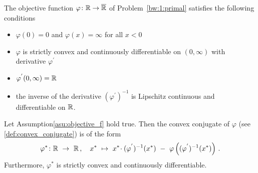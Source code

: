 \newpage
\begin{assumption}
  \label{asu:objective_f}
  The objective function $\varphi\colon \mathbb{R}\to\overline{\mathbb{R}}$ of Problem~\ref{bw:1:primal} 
  satisfies the following conditions
  \begin{itemize}
    \item
      $\varphi(0)=0$ and $\varphi(x)=\infty$ for all $x<0$
    \item
      $\varphi$ is strictly convex and continuously differentiable on $(0,\infty)$ with derivative $\varphi^{'}$
    \item
      $\varphi^{'}(0,\infty)=\mathbb{R}$
    \item
      the inverse of the derivative $(\varphi^{'})^{-1}$ is Lipschitz continuous and differentiable on $\mathbb{R}$.
  \end{itemize}
\end{assumption}
\begin{lemma}
  Let Assumption\ref{asu:objective_f} hold true. Then the convex conjugate of $\varphi$ (see \eqref{def:convex_conjugate}) is of the form
  \begin{gather*}
    \varphi^*
    \colon
    \R
    \ 
    \to
    \ 
    \R
    \,,
    \quad
    x^*
    \ 
    \mapsto
    \ 
    x^*
    \!
    \cdot
    (
    \varphi^{'}
    )^{-1}
    (x^*)
    \ 
    -
    \ 
    \varphi
    \left( 
      (
    \varphi^{'}
    )^{-1}
    (x^*)
    \right)
    \,.
  \end{gather*}
  Furthermore, $\varphi^*$ is strictly convex and continuously differentiable.
\end{lemma}
